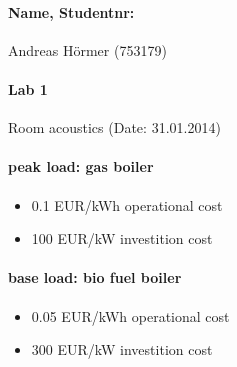 \documentclass{article}
\begin{document}
	\paragraph{Name, Studentnr: }Andreas H\"ormer (753179)
	\paragraph{Lab 1}Room acoustics (Date: 31.01.2014)
	\paragraph{peak load: gas boiler}
		\begin{itemize}
			\item 0.1 EUR/kWh operational cost
			\item 100 EUR/kW investition cost
		\end{itemize}
	\paragraph{base load: bio fuel boiler}
		\begin{itemize}
			\item 0.05 EUR/kWh operational cost
			\item 300 EUR/kW investition cost
		\end{itemize}
\end{document}
